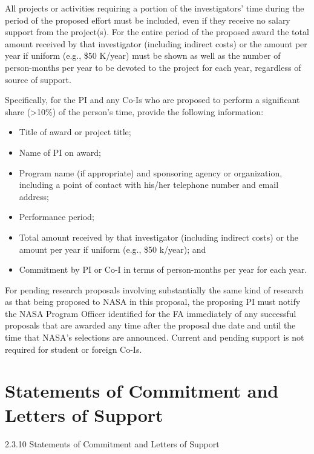 \documentclass[12pt]{article}
\begin{document}
All projects or activities requiring a portion of the investigators'
time during the period of the proposed effort must be included, even
if they receive no salary support from the project(s). For the entire
period of the proposed award the total amount received by that
investigator (including indirect costs) or the amount per year if
uniform (e.g., \$50 K/year) must be shown as well as the number of
person-months per year to be devoted to the project for each year,
regardless of source of support.

Specifically, for the PI and any Co-Is who are proposed to perform a
significant share (>10\%) of the person's time, provide the following
information:
\begin{itemize}
\item Title of award or project title;
\item Name of PI on award;
\item Program name (if appropriate) and sponsoring agency or organization,
  including a point of contact with his/her telephone number and email
  address;
\item Performance period;
\item Total amount received by that investigator (including indirect
  costs) or the amount per year if uniform (e.g., \$50 k/year); and
\item Commitment by PI or Co-I in terms of person-months per year for each
  year.
\end{itemize}

For pending research proposals involving substantially the same kind
of research as that being proposed to NASA in this proposal, the
proposing PI must notify the NASA Program Officer identified for the
FA immediately of any successful proposals that are awarded any time
after the proposal due date and until the time that NASA's selections
are announced.  Current and pending support is not required for
student or foreign Co-Is.



\cleardoublepage

\section*{Statements of Commitment and Letters of Support}
2.3.10 Statements of Commitment and Letters of Support
\end{document}
